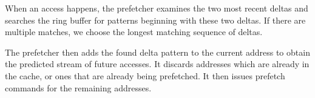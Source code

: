 When an access happens, the prefetcher
examines the two most recent deltas and searches the ring buffer for patterns
beginning with these two deltas. If there are multiple matches, we choose the
longest matching sequence of deltas.

The prefetcher then adds the found delta pattern to the current address to
obtain the predicted stream of future accesses. It discards addresses which
are already in the cache, or ones that are already being prefetched. It then
issues prefetch commands for the remaining addresses.


